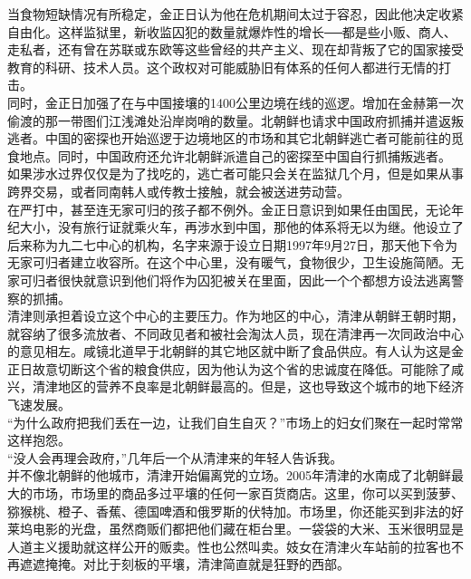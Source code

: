 当食物短缺情况有所稳定，金正日认为他在危机期间太过于容忍，因此他决定收紧自由化。这样监狱里，新收监囚犯的数量就爆炸性的增长──都是些小贩、商人、走私者，还有曾在苏联或东欧等这些曾经的共产主义、现在却背叛了它的国家接受教育的科研、技术人员。这个政权对可能威胁旧有体系的任何人都进行无情的打击。\\

同时，金正日加强了在与中国接壤的1400公里边境在线的巡逻。增加在金赫第一次偷渡的那一带图们江浅滩处沿岸岗哨的数量。北朝鲜也请求中国政府抓捕并遣返叛逃者。中国的密探也开始巡逻于边境地区的市场和其它北朝鲜逃亡者可能前往的觅食地点。同时，中国政府还允许北朝鲜派遣自己的密探至中国自行抓捕叛逃者。\\

如果涉水过界仅仅是为了找吃的，逃亡者可能只会关在监狱几个月，但是如果从事跨界交易，或者同南韩人或传教士接触，就会被送进劳动营。\\

在严打中，甚至连无家可归的孩子都不例外。金正日意识到如果任由国民，无论年纪大小，没有旅行证就乘火车，再涉水到中国，那他的体系将无以为继。他设立了后来称为九二七中心的机构，名字来源于设立日期1997年9月27日，那天他下令为无家可归者建立收容所。在这个中心里，没有暖气，食物很少，卫生设施简陋。无家可归者很快就意识到他们将作为囚犯被关在里面，因此一个个都想方设法逃离警察的抓捕。\\

清津则承担着设立这个中心的主要压力。作为地区的中心，清津从朝鲜王朝时期，就容纳了很多流放者、不同政见者和被社会淘汰人员，现在清津再一次同政治中心的意见相左。咸镜北道早于北朝鲜的其它地区就中断了食品供应。有人认为这是金正日故意切断这个省的粮食供应，因为他认为这个省的忠诚度在降低。可能除了咸兴，清津地区的营养不良率是北朝鲜最高的。但是，这也导致这个城市的地下经济飞速发展。\\

“为什么政府把我们丢在一边，让我们自生自灭？”市场上的妇女们聚在一起时常常这样抱怨。\\

“没人会再理会政府，”几年后一个从清津来的年轻人告诉我。\\

并不像北朝鲜的他城市，清津开始偏离党的立场。2005年清津的水南成了北朝鲜最大的市场，市场里的商品多过平壤的任何一家百货商店。这里，你可以买到菠萝、猕猴桃、橙子、香蕉、德国啤酒和俄罗斯的伏特加。市场里，你还能买到非法的好莱坞电影的光盘，虽然商贩们都把他们藏在柜台里。一袋袋的大米、玉米很明显是人道主义援助就这样公开的贩卖。性也公然叫卖。妓女在清津火车站前的拉客也不再遮遮掩掩。对比于刻板的平壤，清津简直就是狂野的西部。\\

